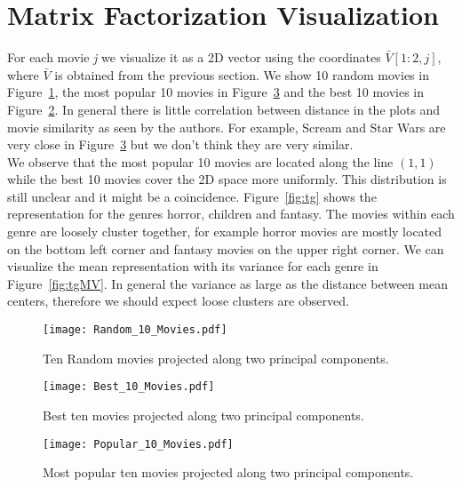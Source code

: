 \section{Matrix Factorization Visualization}

For each movie \textit{j} we visualize it as a 2D vector using the coordinates $\bar{V}[1:2,j]$, where $\bar{V}$ is obtained from the previous section. We show 10 random movies in Figure~\ref{fig:tenRandom}, the most popular 10 movies in Figure~\ref{fig:tenMostPopular} and the best 10 movies in Figure~\ref{fig:tenBest}. In general there is little correlation between distance in the plots and movie similarity as seen by the authors. For example, Scream and Star Wars are very close in Figure~\ref{fig:tenMostPopular} but we don't think they are very similar.\\
We observe that the most popular 10 movies are located along the line $(1,1)$ while the best 10 movies cover the 2D space more uniformly. This distribution is still unclear and it might be a coincidence. 
Figure~\ref{fig:tg} shows the representation for the genres horror, children and fantasy. The movies within each genre are loosely cluster together, for example horror movies are mostly located on the bottom left corner and fantasy movies on the upper right corner. We can visualize the mean representation with its variance for each genre in Figure~\ref{fig:tgMV}. In general the variance as large as the distance between mean centers, therefore we should expect loose clusters are observed. 



\begin{figure}[hptb]
\centering
\texttt{[image: Random\_10\_Movies.pdf]}
 \caption{Ten Random movies projected along two principal components.}
\label{fig:tenRandom}
\end{figure}


\begin{figure}[hptb]
\centering
\texttt{[image: Best\_10\_Movies.pdf]}
 \caption{Best ten movies projected along two principal components.}
\label{fig:tenBest}
\end{figure}


\begin{figure}[hptb]
\centering
\texttt{[image: Popular\_10\_Movies.pdf]}
 \caption{Most popular ten movies projected along two principal components.}
\label{fig:tenMostPopular}
\end{figure}


